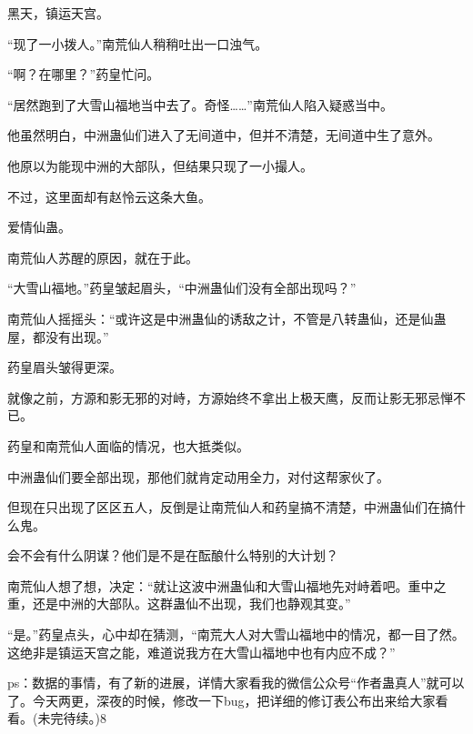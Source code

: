 \begin{this_body}
黑天，镇运天宫。

“现了一小拨人。”南荒仙人稍稍吐出一口浊气。

“啊？在哪里？”药皇忙问。

“居然跑到了大雪山福地当中去了。奇怪……”南荒仙人陷入疑惑当中。

他虽然明白，中洲蛊仙们进入了无间道中，但并不清楚，无间道中生了意外。

他原以为能现中洲的大部队，但结果只现了一小撮人。

不过，这里面却有赵怜云这条大鱼。

爱情仙蛊。

南荒仙人苏醒的原因，就在于此。

“大雪山福地。”药皇皱起眉头，“中洲蛊仙们没有全部出现吗？”

南荒仙人摇摇头：“或许这是中洲蛊仙的诱敌之计，不管是八转蛊仙，还是仙蛊屋，都没有出现。”

药皇眉头皱得更深。

就像之前，方源和影无邪的对峙，方源始终不拿出上极天鹰，反而让影无邪忌惮不已。

药皇和南荒仙人面临的情况，也大抵类似。

中洲蛊仙们要全部出现，那他们就肯定动用全力，对付这帮家伙了。

但现在只出现了区区五人，反倒是让南荒仙人和药皇搞不清楚，中洲蛊仙们在搞什么鬼。

会不会有什么阴谋？他们是不是在酝酿什么特别的大计划？

南荒仙人想了想，决定：“就让这波中洲蛊仙和大雪山福地先对峙着吧。重中之重，还是中洲的大部队。这群蛊仙不出现，我们也静观其变。”

“是。”药皇点头，心中却在猜测，“南荒大人对大雪山福地中的情况，都一目了然。这绝非是镇运天宫之能，难道说我方在大雪山福地中也有内应不成？”

ps：数据的事情，有了新的进展，详情大家看我的微信公众号“作者蛊真人”就可以了。今天两更，深夜的时候，修改一下bug，把详细的修订表公布出来给大家看看。(未完待续。)8

\end{this_body}

